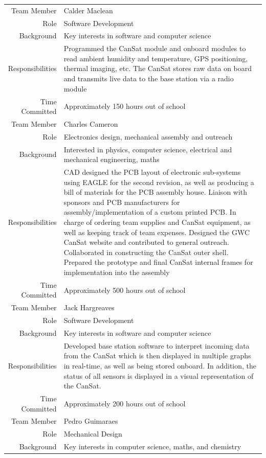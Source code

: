 \documentclass[]{report}
\begin{document}
\begin{center}
\begin{longtable}{rp{13cm}}
		\hline
		Team Member&Calder Maclean \\
		Role&Software Development \\
		Background&Key interests in software and computer science \\
		Responsibilities&Programmed the CanSat module and onboard modules to read ambient humidity and temperature, GPS positioning, thermal imaging, etc. The CanSat stores raw data on board and transmits live data to the base station via a radio module\\
		Time Committed&Approximately 150 hours out of school\\
		\hline
		Team Member&Charles Cameron \\
		Role&Electronics design, mechanical assembly and outreach \\
		Background&Interested in physics, computer science, electrical and mechanical engineering, maths \\
		Responsibilities&CAD designed the PCB layout of electronic sub-systems using EAGLE for the second revision, as well as producing a bill of materials for the PCB assembly house. Liaison with sponsors and PCB manufacturers for assembly/implementation of a custom printed PCB. In charge of ordering team supplies and CanSat equipment, as well as keeping track of team expenses. Designed the GWC CanSat website and contributed to general outreach. Collaborated in constructing the CanSat outer shell.
		Prepared the prototype and final CanSat internal frames for implementation into the assembly \\
		Time Committed&Approximately 500 hours out of school\\
		\hline
		Team Member&Jack Hargreaves \\
		Role&Software Development \\
		Background&Key interests in software and computer science \\
		Responsibilities&Developed base station software to interpret incoming data from the CanSat which is then displayed in multiple graphs in real-time, as well as being stored onboard. In addition, the status of all sensors is displayed in a visual representation of the CanSat.\\
		Time Committed&Approximately 200 hours out of school\\
		\hline
		Team Member&Pedro Guimaraes \\
		Role&Mechanical Design \\
		Background&Key interests in computer science, maths, and chemistry \\

\end{longtable}
\end{center}
\end{document}
